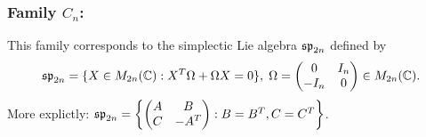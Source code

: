 \subsubsection{\texorpdfstring{Family $C_n$:}{Family :}}
This family corresponds to the simplectic Lie algebra $\mathfrak{sp}_{2n}$ defined by 
\begin{equation}
    \mathfrak{sp}_{2n}=\{X\in M_{2n}(\mathbb{C}): X^T\Omega+\Omega X=0\},\;\Omega = \begin{pmatrix}
        0& I_n\\ -I_n&0
    \end{pmatrix}\in M_{2n}(\mathbb{C}).
\end{equation}
More explictly: $\mathfrak{sp}_{2n}=\left\{\begin{pmatrix}A&B\\C&-A^T\end{pmatrix}: B=B^T,C=C^T\right\}$.
